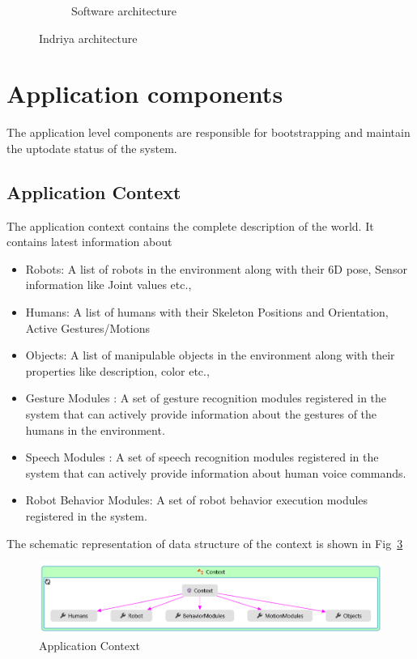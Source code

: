 \begin{figure}
\begin{subfigure}[t]{0.44\textwidth}
\caption[Software architecture]{Software architecture}
\label{fig:architecture}
\end{subfigure}
\caption[Indriya architecture]{Indriya architecture}
\label{fig:indriya_arch}
\end{figure}
\section{Application components}
\label{ssec:app_comp}
The application level components are responsible for bootstrapping and maintain the uptodate status of the system. 
\subsection*{Application Context}
The application context contains the complete description of the world. It contains latest information about
\begin{itemize}[leftmargin={1cm},topsep={0pt},itemsep={0pt},partopsep={0pt},parsep={0pt}] 
\item Robots: A list of robots in the environment along with their 6D pose, Sensor information like Joint values etc.,
\item Humans: A list of humans with their Skeleton Positions and Orientation, Active Gestures/Motions
\item Objects: A list of manipulable objects in the environment along with their properties like description, color etc.,
\item Gesture Modules : A set of gesture recognition modules registered in the system that can actively provide information about the gestures of the humans in the environment.
\item Speech Modules : A set of speech recognition modules registered in the system that can actively provide information about human voice commands.
\item Robot Behavior Modules: A set of robot behavior execution modules registered in the system.
\end{itemize}
The schematic representation of data structure of the context is shown in Fig~\ref{fig:system_context}
\begin{figure}
\centering
\includegraphics[width=\textwidth]{assets/context_diagram.png}
\caption[Application Context]{Application Context}
\label{fig:system_context}
\end{figure}
